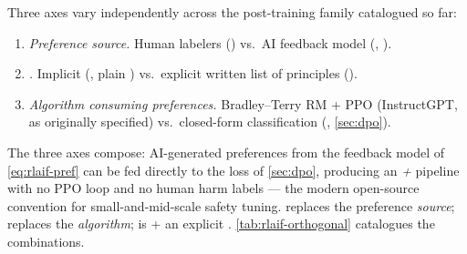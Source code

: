 Three axes vary independently across the post-training family
catalogued so far:
\begin{enumerate}
\item \emph{Preference source.} Human labelers () vs.\ AI feedback
model (, ).
\item \emph{.} Implicit (, plain ) vs.\ explicit
written list of principles ().
\item \emph{Algorithm consuming preferences.} Bradley--Terry RM + PPO
(InstructGPT,  as originally specified) vs.\ closed-form
classification (, \cref{sec:dpo}).
\end{enumerate}
The three axes compose: AI-generated preferences from the feedback
model of \cref{eq:rlaif-pref} can be fed directly to the  loss of
\cref{sec:dpo}, producing an \emph{ + } pipeline with no PPO
loop and no human harm labels — the modern open-source convention for
small-and-mid-scale safety tuning.  replaces the preference
\emph{source};  replaces the \emph{algorithm};  is  + an
explicit . \cref{tab:rlaif-orthogonal} catalogues the
combinations.

